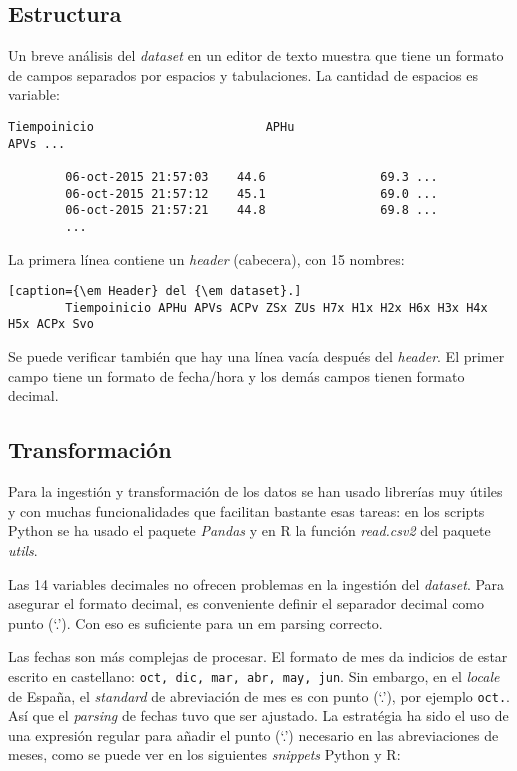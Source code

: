 \documentclass[11pt,spanish,listoffigures,listoftables]{tfgetsinf}
\begin{document}
        \subsection{Estructura}
        Un breve análisis del {\em dataset} en un editor de texto muestra que tiene un formato de campos separados por espacios y tabulaciones. La cantidad de espacios es variable:
    
        \lstset{style=default}
        \lstset{
          showspaces = true
        }
        \begin{lstlisting}[caption=Ejemplo del {\em dataset}.]
        Tiempoinicio                    	APHu                            	APVs ...
        
        06-oct-2015 21:57:03 	44.6             	69.3 ...
        06-oct-2015 21:57:12 	45.1             	69.0 ...
        06-oct-2015 21:57:21 	44.8             	69.8 ...
        ...
        \end{lstlisting}
        
        \lstset{
          showspaces = false
        }
        La primera línea contiene un {\em header} (cabecera), con 15 nombres: 
        \begin{lstlisting}[caption={\em Header} del {\em dataset}.]
        Tiempoinicio APHu APVs ACPv ZSx ZUs H7x H1x H2x H6x H3x H4x H5x ACPx Svo
        \end{lstlisting}
        
        Se puede verificar también que hay una línea vacía después del {\em header}. El primer campo tiene un formato de fecha/hora y los demás campos tienen formato decimal.
    
        \subsection{Transformación}
        Para la ingestión y transformación de los datos se han usado librerías muy útiles y con muchas funcionalidades que facilitan bastante esas tareas: en los scripts Python se ha usado el paquete {\em Pandas} y en R la función {\em read.csv2} del paquete {\em utils}.
        
        Las 14 variables decimales no ofrecen problemas en la ingestión del {\em dataset}. Para asegurar el formato decimal, es conveniente definir el separador decimal como punto (`.'). Con eso es suficiente para un {em parsing} correcto.
        
        Las fechas son más complejas de procesar. El formato de mes da indicios de estar escrito en castellano: {\tt oct, dic, mar, abr, may, jun}. Sin embargo, en el {\em locale} de España, el {\em standard} de abreviación de mes es con punto (`.'), por ejemplo {\tt oct.}. Así que el {\em parsing} de fechas tuvo que ser ajustado. La estratégia ha sido el uso de una expresión regular para añadir el punto (`.') necesario en las abreviaciones de meses, como se puede ver en los siguientes {\em snippets} Python y R:
        
\end{document}
